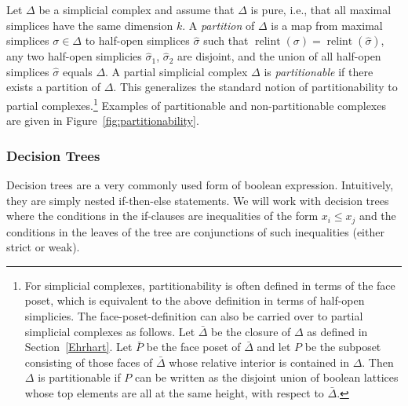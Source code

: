 \documentclass[12pt,reqno]{amsart}
\numberwithin{definition}{section}
\theoremstyle{definition}
\newcommand{\relint}{\operatorname{relint}}
\begin{document}
Let $\Delta$ be a simplicial complex and assume that $\Delta$ is pure, i.e., that all maximal simplices have the same dimension $k$. A \emph{partition} of $\Delta$ is a map from maximal simplices $\sigma\in\Delta$ to half-open simplices $\hat{\sigma}$ such that $\relint(\sigma)=\relint(\hat{\sigma})$, any two half-open simplicies $\hat{\sigma}_1$, $\hat{\sigma}_2$ are disjoint, and the union of all half-open simplices $\hat{\sigma}$ equals $\Delta$. A partial simplicial complex $\Delta$ is \emph{partitionable} if there exists a partition of $\Delta$. This generalizes the standard notion of partitionability to partial complexes.\footnote{For simplicial complexes, partitionability is often defined in terms of the face poset, which is equivalent to the above definition in terms of half-open simplicies. The face-poset-definition can also be carried over to partial simplicial complexes as follows. Let $\bar{\Delta}$ be the closure of $\Delta$ as defined in Section~\ref{Ehrhart}. Let $\bar{P}$ be the face poset of $\bar{\Delta}$ and let $P$ be the subposet consisting of those faces of $\bar{\Delta}$ whose relative interior is contained in $\Delta$. Then $\Delta$ is partitionable if $P$ can be written as the disjoint union of boolean lattices whose top elements are all at the same height, with respect to $\bar{\Delta}$.} Examples of partitionable and non-partitionable complexes are given in Figure~\ref{fig:partitionability}.

\subsubsection{Decision Trees} Decision trees are a very commonly used form of boolean expression. Intuitively, they are simply nested if-then-else statements. We will work with decision trees where the conditions in the if-clauses are inequalities of the form $x_i \leq x_j$ and the conditions in the leaves of the tree are conjunctions of such inequalities (either strict or weak).
\end{document}
